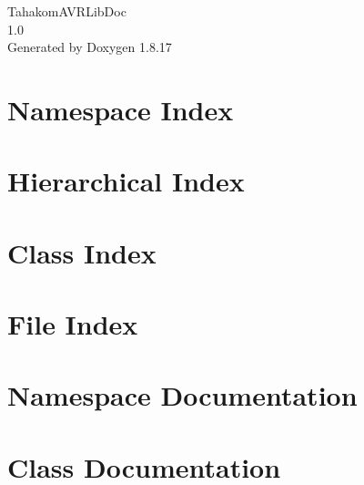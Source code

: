 \let\mypdfximage\pdfximage\def\pdfximage{\immediate\mypdfximage}\documentclass[twoside]{book}
\newcommand{\+}{\discretionary{\mbox{\scriptsize$\hookleftarrow$}}{}{}}
\newcommand{\clearemptydoublepage}{%
  \newpage{\pagestyle{empty}\cleardoublepage}%
}
\begin{document}
\hypersetup{pageanchor=false,
             bookmarksnumbered=true,
             pdfencoding=unicode
            }
\begin{titlepage}
\vspace*{7cm}
\begin{center}%
{\Large Tahakom\+A\+V\+R\+Lib\+Doc \\[1ex]\large 1.\+0 }\\
\vspace*{1cm}
{\large Generated by Doxygen 1.8.17}\\
\end{center}
\end{titlepage}
\clearemptydoublepage
{}
\tableofcontents
\clearemptydoublepage
{}
\hypersetup{pageanchor=true}

\chapter{Namespace Index}

\chapter{Hierarchical Index}

\chapter{Class Index}

\chapter{File Index}

\chapter{Namespace Documentation}




\chapter{Class Documentation}



















\end{document}
